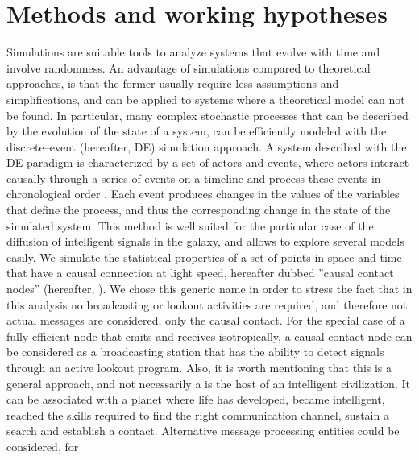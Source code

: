 

      

\section{Methods and working hypotheses}\label{S_methods}

Simulations are suitable tools to analyze systems that evolve with
time and involve randomness.
%
An advantage of simulations compared to theoretical approaches, is
that the former usually require less assumptions and simplifications,
and can be applied to systems where a theoretical model can not be
found.
%
In particular, many complex stochastic processes that can be described
by the evolution of the state of a system, can be efficiently modeled
with the discrete--event (hereafter, DE) simulation approach.
%
A system described with the DE paradigm is characterized by a set of
actors and events, where actors interact causally through a series of
events on a timeline and process these events in chronological order
\citep{ptolemaeus_system_2014, chung_simulation_2003,
ross_simulation_2012}.
%
Each event produces changes in the values of the variables that define
the process, and thus the corresponding change in the state of the
simulated system.
%
This method is well suited for the particular case of the diffusion of
intelligent signals in the galaxy, and allows to explore several
models easily.
%
We simulate the statistical properties of a set of points in space and
time that have a causal connection
at light speed, hereafter dubbed ''causal contact nodes'' (hereafter, \ceti{}).
%
%
We chose this generic name in order to stress the fact that in this
analysis no broadcasting or lookout activities are required, 
and therefore not actual messages are considered, only the causal
contact.
%
For the special case of a fully efficient node that emits
and receives isotropically, a causal contact node can be considered as
a broadcasting station that has the ability to detect signals through
an active lookout program.
%
Also, it is worth mentioning that this is a general approach, and not
necessarily a \ceti{} is the host of an intelligent civilization.
%
It can be associated with a planet where life has developed,
became intelligent, reached the skills required to find the right
communication channel, sustain a search and establish a contact.
%
Alternative message processing entities could be considered, for
